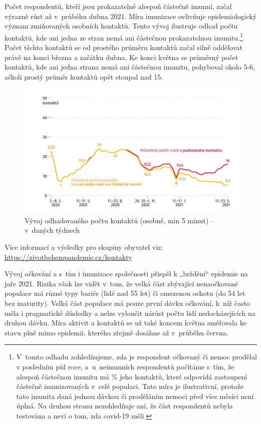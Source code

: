 Počet respondentů, kteří jsou prokazatelně alespoň částečně imunní, začal výrazně růst až v průběhu dubna 2021. Míra imunizace ovlivňuje epidemiologický význam zmiňovaných osobních kontaktů. Tento vývoj ilustruje odhad počtu kontaktů, kde ani jedna ze stran nemá ani částečnou prokazatelnou imunitu.\footnote{V tomto odhadu zohledňujeme, zda je respondent očkovaný či nemoc prodělal v posledním půl roce, a u neimunních respondentů počítáme s tím, že alespoň částečnou imunitu má \% jeho kontaktů, které odpovídá zastoupení částečně imunizovaných v celé populaci. Tato míra je ilustrativní, protože tato imunita daná jednou dávkou či proděláním nemoci před více měsíci není úplná. Na druhou stranu nezohledňuje ani, že část respondentů nebyla testována a neví o tom, zda covid-19 měli.} Počet těchto kontaktů se od prostého průměru kontaktů začal silně oddělovat právě na konci března a začátku dubna. Ke konci května se průměrný počet kontaktů, kde ani jedna strana nemá ani částečnou imunitu, pohyboval okolo 5-6, ačkoli prostý průměr kontaktů opět stoupal nad 15.

\begin{figure}[ht]
    \centering
    \includegraphics[width=\textwidth]{./pic/zbp-graf7.png}
    \caption{Vývoj odhadovaného počtu kontaktů (osobně, min 5 minut) – v daných týdnech}
    \label{fig:zbp7}
\end{figure}

Více informací a výsledky pro skupiny obyvatel viz: \url{https://zivotbehempandemie.cz/kontakty}

Vývoj očkování a s tím i imunizace společnosti přispěl k „brždění“ epidemie na jaře 2021. Rizika však lze vidět v tom, že velká část zbývající nenaočkované populace má různé typy bariér (lidé nad 55 let) či omezenou ochotu (do 54 let bez maturity). Velká část populace má pouze první dávku očkování, k níž často měla i pragmatické důsledky a nelze vyloučit nárůst počtu lidí nedocházejících na druhou dávku. Míra aktivit a kontaktů se už také koncem května směřovala ke stavu plně mimo epidemii, kterého zřejmě dosáhne až v průběhu června.

